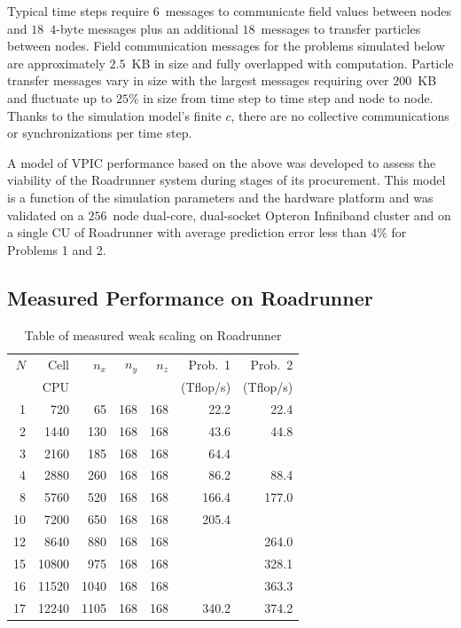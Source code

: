 \documentclass[journal,twoside]{IEEEtran}
\begin{document}
Typical time steps require $6$~messages to communicate field values
between nodes and $18$~$4$-byte messages plus an additional
$18$~messages to transfer particles between nodes.  Field
communication messages for the problems simulated below are
approximately $2.5$~KB in size and fully overlapped with computation.
Particle transfer messages vary in size with the largest messages
requiring over $200$~KB and fluctuate up to $25\%$ in size from time step to
time step and node to node.  Thanks to the simulation model's finite
$c$, there are no collective communications or synchronizations per
time step.

A model of VPIC performance based on the above was developed to assess
the viability of the Roadrunner system during stages of its
procurement.  This model is a function of the simulation parameters
and the hardware platform and was validated on a $256$~node dual-core,
dual-socket Opteron Infiniband cluster and on a single CU of
Roadrunner with average prediction error less than $4\%$ for Problems
1 and 2.

\subsection{Measured Performance on Roadrunner}

\begin{table}
\caption{Table of measured weak scaling on Roadrunner}
\begin{center}
\begin{tabular}{rrrrrrr}
\hline
\hline
$N$ &  Cell & $n_x$ & $n_y$ & $n_z$ &   Prob.~1 &   Prob.~2  \\
    &   CPU &       &       &       & (Tflop/s) & (Tflop/s)  \\
\hline
  1 &   720 &    65 &   168 &   168 &      22.2 &      22.4  \\ 
  2 &  1440 &   130 &   168 &   168 &      43.6 &      44.8  \\
  3 &  2160 &   185 &   168 &   168 &      64.4 &            \\
  4 &  2880 &   260 &   168 &   168 &      86.2 &      88.4  \\
  8 &  5760 &   520 &   168 &   168 &     166.4 &     177.0  \\
 10 &  7200 &   650 &   168 &   168 &     205.4 &            \\
 12 &  8640 &   880 &   168 &   168 &           &     264.0  \\
 15 & 10800 &   975 &   168 &   168 &           &     328.1  \\
 16 & 11520 &  1040 &   168 &   168 &           &     363.3  \\
 17 & 12240 &  1105 &   168 &   168 &     340.2 &     374.2  \\
\hline
\end{tabular}
\end{center}
\label{tbl:weakscaling}
\end{table}
\end{document}
